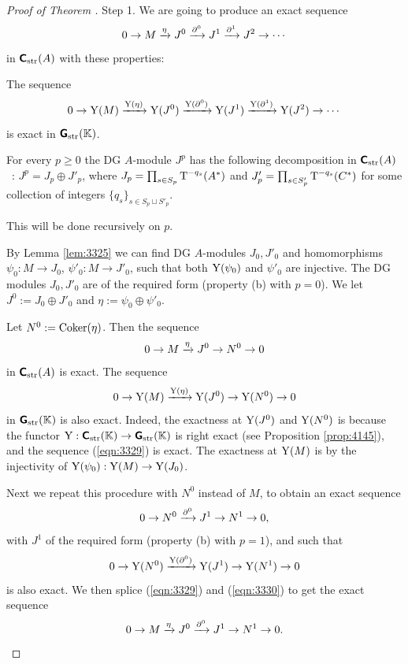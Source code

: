 \begin{proof}[Proof of Theorem \tup{\ref{thm:3325}}]
\mbox{}

\smallskip \noindent
Step 1. We are going to produce an exact sequence 
\begin{equation} \label{eqn:3338}
0 \to M \xrightarrow{\eta} J^0 \xrightarrow{\partial^0} J^1 \xrightarrow{\partial^1} J^2 \to \cdots  
\end{equation}
in $\boldsymbol{\mathsf{C}}_{\mathrm{str}}(A)$ with these properties: 
\begin{itemize}
 The sequence 
\[ 0 \to \operatorname{Y}(M) \xrightarrow{\operatorname{Y}(\eta)} \operatorname{Y}(J^0) \xrightarrow{\operatorname{Y}(\partial^0)} 
\operatorname{Y}(J^1) \xrightarrow{\operatorname{Y}(\partial^1)} \operatorname{Y}(J^2) \to \cdots \]
is exact in $\boldsymbol{\mathsf{G}}_{\mathrm{str}}(\mathbb{K})$.

 For every $p \geq 0$ the DG $A$-module $J^p$ has the following 
decomposition 
in $\boldsymbol{\mathsf{C}}_{\mathrm{str}}(A)$~: 
$J^p = J_p \oplus J'_p$, where
$J_p = \prod_{s \in S_p} \operatorname{T}^{-q_s}(A^*)$
and 
$J'_p = \lb \prod_{s \in S'_p} \opn{T}^{-q_s}(C^*)$ 
for some collection of integers 
$\{ q_s \}_{s \in S_p \sqcup S'_p}$. 
\end{itemize}
This will be done recursively on $p$. 

By Lemma \ref{lem:3325} we can find DG $A$-modules $J_0, J'_0$ 
and homomorphisms 
$\psi_0 : M \to J_0$, $\psi'_0 : M \to J'_0$, such that both $\operatorname{Y}(\psi_0)$
and $\psi'_0$ are injective. The DG modules $J_0, J'_0$ are of the required 
form (property (b) with $p = 0$). We let 
$J^0 := J_0 \oplus J'_0$ and $\eta := \psi_0 \oplus \psi'_0$. 

Let $N^0 := \operatorname{Coker}(\eta)$. Then the sequence 
\begin{equation} \label{eqn:3329}
0 \to M \xrightarrow{\eta} J^0 \to N^0 \to 0 
\end{equation}
in $\boldsymbol{\mathsf{C}}_{\mathrm{str}}(A)$ is exact. The sequence 
\[ 0 \to \operatorname{Y}(M) \xrightarrow{\operatorname{Y}(\eta)} \operatorname{Y}(J^0) \to \operatorname{Y}(N^0) \to  0 \]
in $\boldsymbol{\mathsf{G}}_{\mathrm{str}}(\mathbb{K})$ is also exact. Indeed, the exactness at 
$\operatorname{Y}(J^0)$ and $\operatorname{Y}(N^0)$ is because the functor 
$\operatorname{Y} : \boldsymbol{\mathsf{C}}_{\mathrm{str}}(\mathbb{K}) \to \boldsymbol{\mathsf{G}}_{\mathrm{str}}(\mathbb{K})$
is right exact (see Proposition \ref{prop:4145}), and the sequence 
(\ref{eqn:3329}) is exact. 
The exactness at $\operatorname{Y}(M)$ is by the injectivity of 
$\operatorname{Y}(\psi_0) : \operatorname{Y}(M) \to \operatorname{Y}(J_0)$.

Next we repeat this procedure with $N^0$ instead of $M$, to obtain an exact 
sequence 
\begin{equation} \label{eqn:3330}
0 \to N^0 \xrightarrow{\partial^0} J^1 \to N^1 \to 0 ,
\end{equation}
with $J^1$ of the required form (property (b) with $p = 1$), and such that 
\[ 0 \to \operatorname{Y}(N^0) \xrightarrow{\operatorname{Y}(\partial^0)} \operatorname{Y}(J^1) \to \operatorname{Y}(N^1) \to  
0 \]
is also exact. We then splice (\ref{eqn:3329}) and (\ref{eqn:3330})
to get the exact sequence 
\[ 0 \to M \xrightarrow{\eta} J^0 \xrightarrow{\partial^0} J^1 \to N^1 \to 0 . \]


\end{proof}
